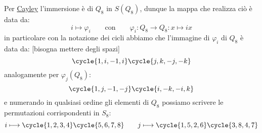 \documentclass[11pt]{scrartcl}
\begin{document}
\begin{soln}
\[            \]
    Per \hyperref[p:Cayley]{Cayley} l'immersione è di $Q_8$ in $S(Q_8)$, dunque la mappa che realizza ciò è data da:
        \[ i \longmapsto \varphi_i \qquad \text{con} \qquad \varphi_i : Q_8 \longrightarrow Q_8 : x \longmapsto ix
            \]
    in particolare con la notazione dei cicli abbiamo che l'immagine di $\varphi_i$ di $Q_8$ è data da: [bisogna mettere degli spazi]
        \[ \cycle{1,i,-1,i}\cycle{j,k,-j,-k}
            \]
    analogamente per $\varphi_j(Q_8)$:
        \[ \cycle{1,j,-1,-j}\cycle{i,-k,-i,k}
            \]
    e numerando in qualsiasi ordine gli elementi di $Q_8$ possiamo scrivere le permutazioni corrispondenti in $S_8$:
        \[ i \longmapsto \cycle{1,2,3,4}\cycle{5,6,7,8} \qquad j \longmapsto \cycle{1,5,2,6}\cycle{3,8,4,7}
            \]
\end{soln}
\end{document}
